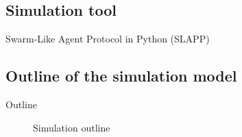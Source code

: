 \documentclass[9pt]{beamer}
\begin{document}
\subsection{Simulation tool}

\begin{frame}{Swarm-Like Agent Protocol in Python (SLAPP)}

\end{frame}

\subsection{Outline of the simulation model}

\begin{frame}{Outline}

\begin{figure}[H]
\center
{}
\caption{Simulation outline}
\label{outline}
\end{figure}


\end{frame}
\end{document}
